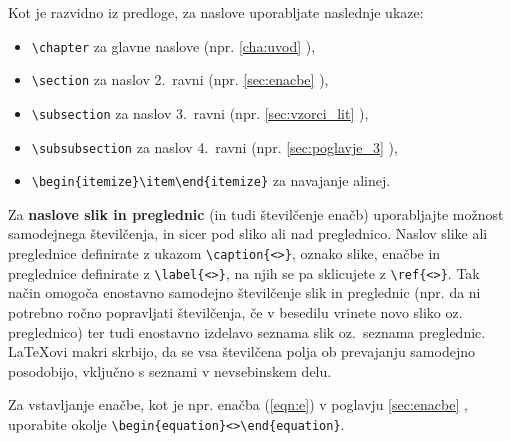 Kot je razvidno iz predloge, za naslove uporabljate naslednje ukaze:
\begin{itemize}
	\item \verb|\chapter| za glavne naslove (npr. \ref{cha:uvod} ),
	\item \verb|\section| za naslov 2.\ ravni (npr. \ref{sec:enacbe} ),
	\item \verb|\subsection| za naslov 3.\ ravni (npr. \ref{sec:vzorci_lit} ),
	\item \verb|\subsubsection| za naslov 4.\ ravni (npr. \ref{sec:poglavje_3} ),
	\item \verb|\begin{itemize}\item\end{itemize}| za navajanje alinej.
\end{itemize}

Za \textbf{naslove slik in preglednic} (in tudi številčenje enačb) uporabljajte možnost samodejnega številčenja, in sicer pod sliko ali nad preglednico. Naslov slike ali preglednice definirate z ukazom \verb|\caption{<>}|, oznako slike, enačbe in preglednice definirate z \verb|\label{<>}|, na njih se pa sklicujete z \verb|\ref{<>}|. Tak način omogoča enostavno samodejno številčenje slik in preglednic (npr. da ni potrebno ročno popravljati številčenja, če v besedilu vrinete novo sliko oz. preglednico) ter tudi enostavno izdelavo seznama slik oz.\ seznama preglednic. \LaTeX ovi makri skrbijo, da se vsa številčena polja ob prevajanju samodejno posodobijo, vključno s seznami v nevsebinskem delu.

Za vstavljanje enačbe, kot je npr. enačba (\ref{eqn:e}) v poglavju \ref{sec:enacbe} , uporabite okolje \verb|\begin{equation}<>\end{equation}|.

